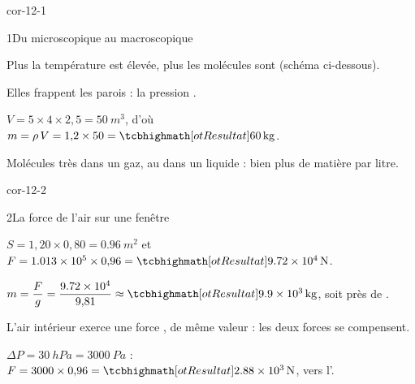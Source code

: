 \corrigesSouples

\begin{blocLivre}{cor-12-1}
\begin{corrige}{1}{Du microscopique au macroscopique}
\begin{questions}
\item Plus la température est élevée, plus les molécules sont  (schéma ci-dessous).
\item Elles frappent les parois  : la pression .
\item $V=5\times4\times2{,}5=\qty{50}{m^3}$, d'où $m=\rho\,V=1{,}2\times50=\res{\qty{60}{kg}}$.
\item Molécules très  dans un gaz, au  dans un liquide : bien plus de matière par litre.
\end{questions}
\end{corrige}
\end{blocLivre}
\begin{blocLivre}{cor-12-2}
\begin{corrige}{2}{La force de l'air sur une fenêtre}
\begin{questions}
\item $S=1{,}20\times0{,}80=\qty{0,96}{m^2}$ et $F=\num{1,013e5}\times0{,}96=\res{\qty{9,72e4}{N}}$.
\item $m=\dfrac{F}{g}=\dfrac{\num{9,72e4}}{9{,}81}\approx\res{\qty{9,9e3}{kg}}$, soit près de .
\item L'air intérieur exerce une force , de même valeur : les deux forces se compensent.
\item $\Delta P=\qty{30}{hPa}=\qty{3000}{Pa}$ : $F=3000\times0{,}96=\res{\qty{2,88e3}{N}}$, vers l'.
\end{questions}
\end{corrige}
\end{blocLivre}
